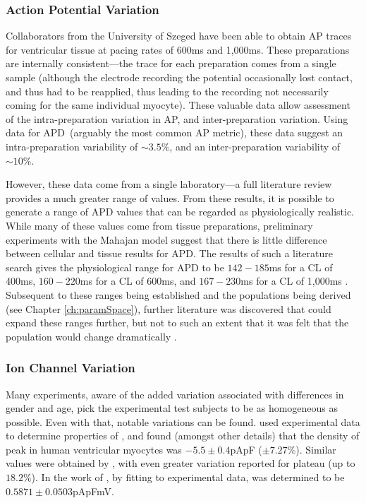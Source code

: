 \documentclass[../thesis-main.tex]{subfiles}
\begin{document}
\subsubsection{Action Potential Variation}
\label{subsubsec:ap-variation}
Collaborators from the University of Szeged have been able to obtain AP traces for ventricular tissue at pacing rates of 600ms and 1,000ms. These preparations are internally consistent---the trace for each preparation comes from a single sample (although the electrode recording the potential occasionally lost contact, and thus had to be reapplied, thus leading to the recording not necessarily coming for the same individual myocyte). These valuable data allow assessment of the intra-preparation variation in AP, and inter-preparation variation. Using data for APD~(arguably the most common AP metric), these data suggest an intra-preparation variability of $\sim3.5\%$, and an inter-preparation variability of $\sim10\%$.

However, these data come from a single laboratory---a full literature review provides a much greater range of values. From these results, it is possible to generate a range of APD values that can be regarded as physiologically realistic. While many of these values come from tissue preparations, preliminary experiments with the Mahajan model suggest that there is little difference between cellular and tissue results for APD. The results of such a literature search gives the physiological range for APD to be $142-185$ms for a CL of 400ms, $160-220$ms for a CL of 600ms, and $167-230$ms for a CL of 1,000ms \citep{Biagetti2006, Szigligeti1996, Yan2001, Jung2011, Goldhaber2005, Wu2011, Wu2008, Wu2008a, Chen2006, Kirchhof2003, Eckardt1998, Zabel1997, Zabel1997a, Kurz1993, McIntosh2000}. Subsequent to these ranges being established and the populations being derived (see Chapter \ref{ch:paramSpace}), further literature was discovered that could expand these ranges further, but not to such an extent that it was felt that the population would change dramatically \citep{Wu2006}.

\subsubsection{Ion Channel Variation}
\label{subsubsec:ionChannel-variation}
Many experiments, aware of the added variation associated with differences in gender and age, pick the experimental test subjects to be as homogeneous as possible. Even with that, notable variations can be found. \citet{Fulop2004} used experimental data to determine properties of \ica{}, and found (amongst other details) that the density of peak \ica{} in human ventricular myocytes was $-5.5\pm0.4$pApF ($\pm7.27\%$). Similar values were obtained by \citet{Li1999}, with even greater variation reported for plateau \ica{} (up to $18.2\%$). In the work of \citet{Fink2008}, by fitting to experimental data, \gkix{} was determined to be $0.5871\pm0.0503$pApFmV.
\end{document}
